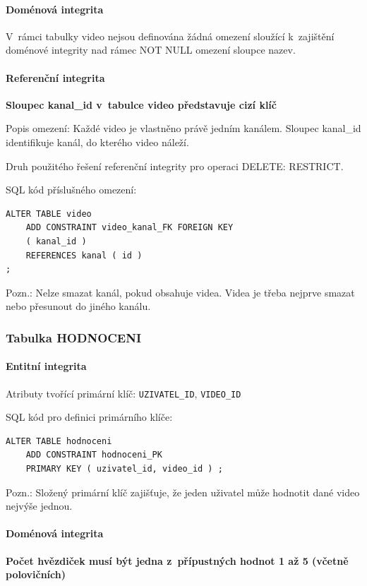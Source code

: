 \documentclass[12pt,a4paper]{article}
\begin{document}
\paragraph{Doménová integrita}
V~rámci tabulky video nejsou definována žádná omezení sloužící k~zajištění doménové
integrity nad rámec NOT NULL omezení sloupce nazev.

\paragraph{Referenční integrita}

\textbf{Sloupec kanal\_id v~tabulce video představuje cizí klíč}

Popis omezení: Každé video je vlastněno právě jedním kanálem. Sloupec kanal\_id
identifikuje kanál, do kterého video náleží.

Druh použitého řešení referenční integrity pro operaci DELETE: RESTRICT.

SQL kód příslušného omezení:
\begin{lstlisting}
ALTER TABLE video
    ADD CONSTRAINT video_kanal_FK FOREIGN KEY
    ( kanal_id )
    REFERENCES kanal ( id )
;
\end{lstlisting}
Pozn.: Nelze smazat kanál, pokud obsahuje videa. Videa je třeba nejprve smazat nebo
přesunout do jiného kanálu.

\subsubsection{Tabulka HODNOCENI}

\paragraph{Entitní integrita}
Atributy tvořící primární klíč: \texttt{UZIVATEL\_ID}, \texttt{VIDEO\_ID}

SQL kód pro definici primárního klíče:
\begin{lstlisting}
ALTER TABLE hodnoceni
    ADD CONSTRAINT hodnoceni_PK
    PRIMARY KEY ( uzivatel_id, video_id ) ;
\end{lstlisting}
Pozn.: Složený primární klíč zajišťuje, že jeden uživatel může hodnotit dané video
nejvýše jednou.

\paragraph{Doménová integrita}

\textbf{Počet hvězdiček musí být jedna z~přípustných hodnot 1 až 5 (včetně polovičních)}
\end{document}
